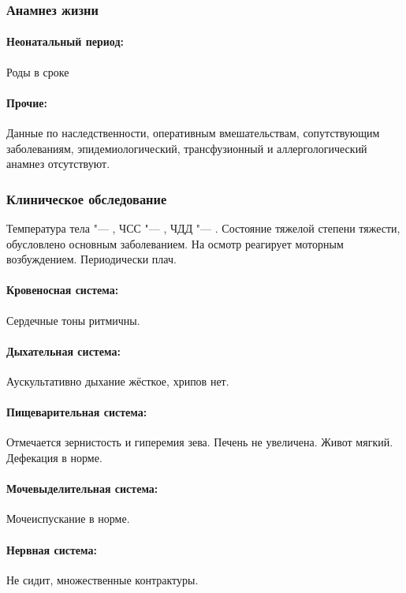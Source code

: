 \documentclass[a4paper,14pt]{extarticle}
\newcommand{\weeks}{нед.}
\newcommand{\oCelsius}{\tcdegree{}C}
\newcommand{\bpm}{уд/мин}
\newcommand{\mpm}{/мин}
\begin{document}
\subsubsection*{Анамнез жизни}

\paragraph{Неонатальный период:}
Роды в сроке \numprint[\weeks]{26}

\paragraph{Прочие:} Данные по наследственности, оперативным вмешательствам, сопутствующим заболеваниям, эпидемиологический, трансфузионный и аллергологический анамнез отсутствуют.

\subsubsection*{Клиническое обследование}

Температура тела "--- \numprint[\oCelsius]{36.6}, ЧСС "--- \numprint[\bpm]{100}, ЧДД "--- \numprint[\mpm]{24}.
Состояние тяжелой степени тяжести, обусловлено основным заболеванием.
На осмотр реагирует моторным возбуждением.
Периодически плач.

\paragraph{Кровеносная система:} Сердечные тоны ритмичны.

\paragraph{Дыхательная система:} Аускультативно дыхание жёсткое, хрипов нет.

\paragraph{Пищеварительная система:} Отмечается зернистость и гиперемия зева. Печень не увеличена. Живот мягкий. Дефекация в норме.

\paragraph{Мочевыделительная система:} Мочеиспускание в норме.

\paragraph{Нервная система:} Не сидит, множественные контрактуры.
\end{document}
